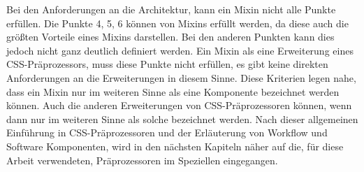 Bei den Anforderungen an die Architektur, kann ein Mixin nicht alle Punkte erfüllen. Die Punkte 4, 5, 6 können von Mixins erfüllt werden, da diese auch die größten Vorteile eines Mixins darstellen. Bei den anderen Punkten kann dies jedoch nicht ganz deutlich definiert werden. \newline
Ein Mixin als eine Erweiterung eines CSS-Präprozessors, muss diese Punkte nicht erfüllen, es gibt keine direkten Anforderungen an die Erweiterungen in diesem Sinne.\newline
Diese Kriterien legen nahe, dass ein Mixin nur im weiteren Sinne als eine Komponente bezeichnet werden können. Auch die anderen Erweiterungen von CSS-Präprozessoren können, wenn dann nur im weiteren Sinne als solche bezeichnet werden.\newline\newline
Nach dieser allgemeinen Einführung in CSS-Präprozessoren und der Erläuterung von Workflow und Software Komponenten, wird in den nächsten Kapiteln näher auf die, für diese Arbeit verwendeten, Präprozessoren im Speziellen eingegangen.
\newpage
